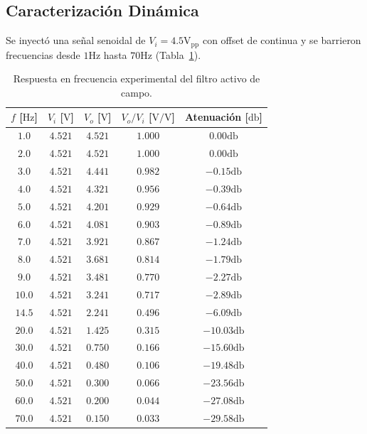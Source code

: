 \subsection{Caracterización Dinámica}
Se inyectó una señal senoidal de $V_i = 4.5 \unit{\volt}_{\text{pp}}$ con offset de continua y se barrieron
frecuencias desde $1 \unit{\hertz}$ hasta $70 \unit{\hertz}$ (Tabla~\ref{tab.ej1:dinamica}).

\begin{table}[!ht]
    \centering
    \small
    \begin{tabular}{ccccc}
        \toprule
        $f$ [$\unit{\hertz}$] & $V_i$ [$\unit{\volt}$] & $V_o$ [$\unit{\volt}$] & $V_o/V_i$ [$\unit{\volt\per\volt}$] & Atenuación [$\unit{\decibel}$] \\
        \midrule
        $1.0$  & $4.521$ & $4.521$ & $1.000$ & $0.00 \unit{\decibel}$ \\
        $2.0$  & $4.521$ & $4.521$ & $1.000$ & $0.00 \unit{\decibel}$ \\
        $3.0$  & $4.521$ & $4.441$ & $0.982$ & $-0.15 \unit{\decibel}$ \\
        $4.0$  & $4.521$ & $4.321$ & $0.956$ & $-0.39 \unit{\decibel}$ \\
        $5.0$  & $4.521$ & $4.201$ & $0.929$ & $-0.64 \unit{\decibel}$ \\
        $6.0$  & $4.521$ & $4.081$ & $0.903$ & $-0.89 \unit{\decibel}$ \\
        $7.0$  & $4.521$ & $3.921$ & $0.867$ & $-1.24 \unit{\decibel}$ \\
        $8.0$  & $4.521$ & $3.681$ & $0.814$ & $-1.79 \unit{\decibel}$ \\
        $9.0$  & $4.521$ & $3.481$ & $0.770$ & $-2.27 \unit{\decibel}$ \\
        $10.0$ & $4.521$ & $3.241$ & $0.717$ & $-2.89 \unit{\decibel}$ \\
        $14.5$ & $4.521$ & $2.241$ & $0.496$ & $-6.09 \unit{\decibel}$ \\
        $20.0$ & $4.521$ & $1.425$ & $0.315$ & $-10.03 \unit{\decibel}$ \\
        $30.0$ & $4.521$ & $0.750$ & $0.166$ & $-15.60 \unit{\decibel}$ \\
        $40.0$ & $4.521$ & $0.480$ & $0.106$ & $-19.48 \unit{\decibel}$ \\
        $50.0$ & $4.521$ & $0.300$ & $0.066$ & $-23.56 \unit{\decibel}$ \\
        $60.0$ & $4.521$ & $0.200$ & $0.044$ & $-27.08 \unit{\decibel}$ \\
        $70.0$ & $4.521$ & $0.150$ & $0.033$ & $-29.58 \unit{\decibel}$ \\
        \bottomrule
    \end{tabular}
    \caption{Respuesta en frecuencia experimental del filtro activo de campo.}
    \label{tab.ej1:dinamica}
\end{table}

